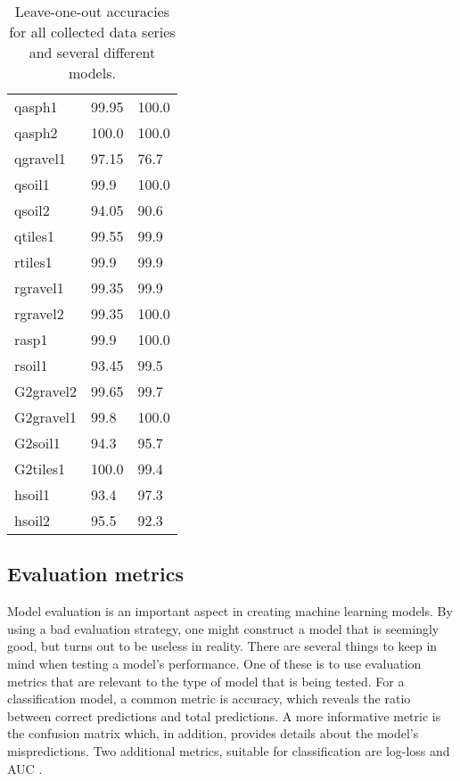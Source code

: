 \begin{table}
\begin{center}
\begin{tabular}{|l|l|l|}
qasph1& 99.95 & \cellcolor{green!20}100.0\\
qasph2& \cellcolor{green!20}100.0 & \cellcolor{green!20}100.0\\
qgravel1& 97.15 & \cellcolor{red!20} 76.7\\
qsoil1 &99.9 & \cellcolor{green!20}100.0\\
qsoil2& 94.05 & \cellcolor{red!20} 90.6\\
qtiles1& 99.55 & 99.9\\
rtiles1 &99.9 & 99.9\\
rgravel1& 99.35 & 99.9\\
rgravel2 &99.35 & \cellcolor{green!20}100.0\\
rasp1 &99.9 & 100.0\\
rsoil1 &\cellcolor{red!20} 93.45 & 99.5\\
G2gravel2& 99.65& 99.7\\ 
G2gravel1& 99.8 & \cellcolor{green!20}100.0\\
G2soil1 &\cellcolor{red!20} 94.3 & 95.7\\
G2tiles1& \cellcolor{green!20}100.0 & 99.4\\
hsoil1 &\cellcolor{red!20} 93.4 &97.3\\
hsoil2 &95.5 & \cellcolor{red!20} 92.3 \\
\hline
  \end{tabular}
\end{center}
\label{tab:loo}
\caption{Leave-one-out accuracies for all collected data series and several different models.}
\end{table}

\subsection{Evaluation metrics}
Model evaluation is an important aspect in creating machine learning models. By using a bad evaluation strategy, one might construct a model that is seemingly good, but turns out to be useless in reality. There are several things to keep in mind when testing a model's performance. One of these is to use evaluation metrics that are relevant to the type of model that is being tested. For a classification model, a common metric is accuracy, which reveals the ratio between correct predictions and total predictions. A more informative metric is the confusion matrix which, in addition, provides details about the model's mispredictions. Two additional metrics, suitable for classification are log-loss and AUC \citep{zheng_2015}. 

